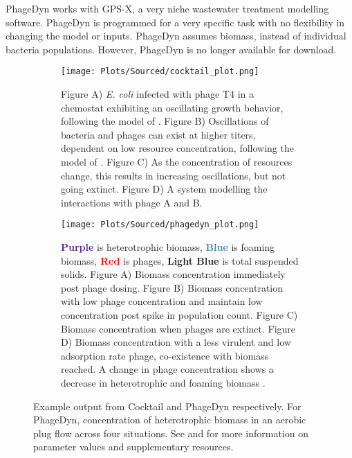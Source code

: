 PhageDyn works with GPS-X, a very niche wastewater treatment modelling software. 
PhageDyn is programmed for a very specific task with no flexibility in changing the model or inputs. 
PhageDyn assumes biomass, instead of individual bacteria populations. 
However, PhageDyn is no longer available for download.

\begin{figure}
    \centering
    \begin{subfigure}{0.49\linewidth}
        \centering
        \captionsetup{width=1\linewidth}
        \texttt{[image: Plots/Sourced/cocktail\_plot.png]}
        \caption{
            Figure A) \textit{E. coli} infected with phage T4 in a chemostat exhibiting an oscillating growth behavior, following the model of \citet{bohannanEffectResourceEnrichment1997}. 
            Figure B) Oscillations of bacteria and phages can exist at higher titers, dependent on low resource concentration, following the model of \citet{lenskiDynamicsInteractionsBacteria1988}. 
            Figure C) As the concentration of resources change, this results in increasing oscillations, but not going extinct. 
            Figure D) A system modelling the interactions with phage A and B. 
        }
        \label{fig:sourced:cocktail_plot}
    \end{subfigure}
    \hfill
    \begin{subfigure}{0.49\linewidth}
        \centering
        \captionsetup{width=1\linewidth}
        \texttt{[image: Plots/Sourced/phagedyn\_plot.png]}
        \caption{
            \textcolor[HTML]{551A8C}{\textbf{Purple}} is heterotrophic biomass, 
            \textcolor[HTML]{4580B4}{\textbf{Blue}} is foaming biomass, 
            \textcolor[HTML]{FF0000}{\textbf{Red}} is phages, 
            \textcolor[HTML]{01E6EE}{\textbf{Light Blue}} is total suspended solids. 
            Figure A) Biomass concentration immediately post phage dosing. 
            Figure B) Biomass concentration with low phage concentration and maintain low concentration post spike in population count. 
            Figure C) Biomass concentration when phages are extinct. 
            Figure D) Biomass concentration with a less virulent and low adsorption rate phage, co-existence with biomass reached. 
            A change in phage concentration shows a decrease in heterotrophic and foaming biomass \cite{krysiak-baltynSimulationPhageDynamics2017}. 
        }
        \label{fig:sourced:phagedyn_plot}
    \end{subfigure}
    \caption{Example output from Cocktail and PhageDyn respectively. For PhageDyn, concentration of heterotrophic biomass in an aerobic plug flow across four situations.
        See \citet{nilssonCocktailComputerProgram2022} and \citet{krysiak-baltynSimulationPhageDynamics2017} for more information on parameter values and supplementary resources. 
    }
    \label{fig:sourced:cocktail_and_phagedyn}
\end{figure}